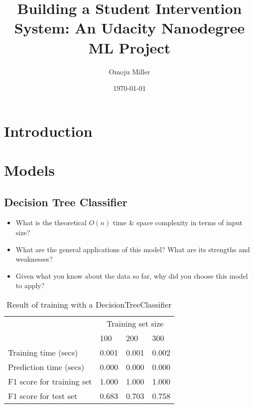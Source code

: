 \documentclass[12pt]{article}
\title{\large \textbf{Building a Student Intervention System: An Udacity Nanodegree ML Project}} %
\author{Omoju Miller}
\date{\today} %
\begin{document}
\raggedright
\maketitle
\thispagestyle{empty}
\pagestyle{empty}



\section*{Introduction}




\section*{Models}

\subsection*{Decision Tree Classifier}
\begin{itemize} [noitemsep,nolistsep]
\item What is the theoretical $O(n)$ time \& space complexity in terms of input size?
\item What are the general applications of this model? What are its strengths and weaknesses?
\item Given what you know about the data so far, why did you choose this model to apply?
\end{itemize} 


\setlength{\extrarowheight}{1.5pt}
\begin{table}[!htbp]
\caption{Result of training with a DecisionTreeClassifier} %
\centering %
\begin{tabular}{|p{6cm}|p{1.5cm}|p{1.5cm}|p{1.5cm}|} %
\hline %
& \multicolumn{3}{c|}{Training set size}\\[5pt]
\cline{2-4} 
& 100 & 200 & 300\\[0.5ex]
\hline %

Training time (secs)   &       0.001 & 0.001 & 0.002 \\
Prediction time (secs)   &     0.000 & 0.000 & 0.000 \\
F1 score for training set  &   1.000 & 1.000 & 1.000 \\
F1 score for test set    &     0.683 & 0.703 & 0.758 \\
\hline %
\end{tabular}
\label{decisionTreeTable}
\end{table}
\end{document}
